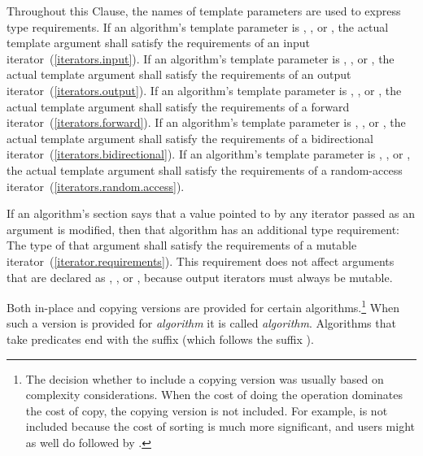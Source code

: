 \begin{removedblock}
\pnum
Throughout this Clause, the names of template parameters
are used to express type requirements.
If an algorithm's template parameter is
,
,
or
,
the actual template argument shall satisfy the
requirements of an input iterator~(\ref{iterators.input}).
If an algorithm's template parameter is
,
,
or
,
the actual template argument shall satisfy the requirements
of an output iterator~(\ref{iterators.output}).
If an algorithm's template parameter is
,
,
or
,
the actual template argument shall satisfy the requirements
of a forward iterator~(\ref{iterators.forward}).
If an algorithm's template parameter is
,
,
or
,
the actual template argument shall satisfy the requirements
of a bidirectional iterator~(\ref{iterators.bidirectional}).
If an algorithm's template parameter is
,
,
or
,
the actual template argument shall satisfy the requirements
of a random-access iterator~(\ref{iterators.random.access}).

\pnum
If an algorithm's
section says that a value pointed to by any iterator passed
as an argument is modified, then that algorithm has an additional
type requirement:
The type of that argument shall satisfy the requirements
of a mutable iterator~(\ref{iterator.requirements}).
\enternote
This requirement does not affect arguments that are declared as
,
,
or
,
because output iterators must always be mutable.
\exitnote
\end{removedblock}

\pnum
Both in-place and copying versions are provided for certain
algorithms.\footnote{The decision whether to include a copying version was
usually based on complexity considerations. When the cost of doing the operation
dominates the cost of copy, the copying version is not included. For example,
 is not included because the cost of sorting is much more
significant, and users might as well do  followed by .}
When such a version is provided for \textit{algorithm} it is called
\textit{algorithm}. Algorithms that take predicates end with the
suffix  (which follows the suffix ).

